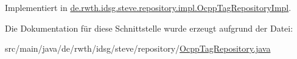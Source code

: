 Implementiert in \hyperlink{classde_1_1rwth_1_1idsg_1_1steve_1_1repository_1_1impl_1_1_ocpp_tag_repository_impl_aef18f57eb52378f4f574ced78da2b501}{de.\-rwth.\-idsg.\-steve.\-repository.\-impl.\-Ocpp\-Tag\-Repository\-Impl}.



Die Dokumentation für diese Schnittstelle wurde erzeugt aufgrund der Datei\-:\begin{DoxyCompactItemize}
\item 
src/main/java/de/rwth/idsg/steve/repository/\hyperlink{_ocpp_tag_repository_8java}{Ocpp\-Tag\-Repository.\-java}\end{DoxyCompactItemize}

